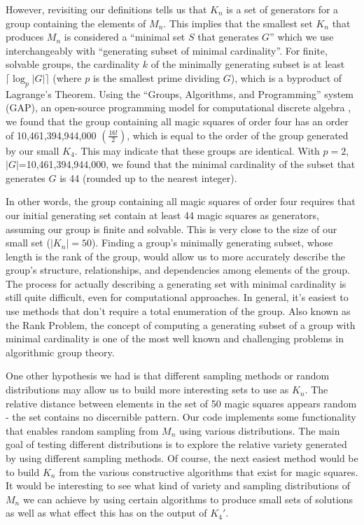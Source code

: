 \documentclass[12pt]{report}
\begin{document}
\par However, revisiting our definitions tells us that $K_n$ is a set of generators for a group
containing the elements of $M_n$. This implies that the smallest set $K_n$ that produces $M_n$ is
considered a ``minimal set $S$ that generates $G$'' which we  use interchangeably with ``generating
subset of minimal cardinality''. For finite, solvable groups, the cardinality $k$ of the minimally
generating subset is at least $\lceil\log_{p}{\left|G\right|}\rceil$ (where $p$ is the smallest
prime dividing $G$), which is a byproduct of Lagrange's Theorem. Using the ``Groups, Algorithms,
and Programming'' system (GAP), an open-source programming model for computational discrete algebra
, we found that the group containing all magic squares of order four has an order of
10,461,394,944,000 $\left(\frac{16!}{2}\right)$, which is equal to the order of the group generated 
by our small $K_4$. This may
indicate that these groups are identical. With $p=2$, $\left|G\right|$=10,461,394,944,000, we found
that the minimal cardinality of the subset that generates $G$ is 44 (rounded up to the nearest
integer).

\par In other words, the group containing all magic squares of order four requires that our initial
generating set contain at least 44 magic squares as generators, assuming our group is finite and
solvable. This is very close to the size of our small set ($\left|K_n\right|=50$). Finding a
group's minimally generating subset, whose length is the rank of the group, would allow us to more
accurately describe the group's structure, relationships, and dependencies among elements of the
group. The process for actually describing a generating set with minimal cardinality is still quite
difficult, even for computational approaches. In general, it's easiest to use methods that don't
require a total enumeration of the group. Also known as the Rank Problem, the concept of computing
a generating subset of a group with minimal cardinality is one of the most well known and
challenging problems in algorithmic group theory.

\par One other hypothesis we had is that different sampling methods or random distributions may
allow us to build more interesting sets to use as $K_n$. The relative distance between elements in
the set of 50 magic squares appears random \hyphen{} the set contains no discernible pattern. Our
code implements some functionality that enables random sampling from $M_n$ using various
distributions. The main goal of testing different distributions is to explore the relative variety
generated by using different sampling methods. Of course, the next easiest method would be to build
$K_n$ from the various constructive algorithms that exist for magic squares. It would be
interesting to see what kind of variety and sampling distributions of $M_n$ we can achieve by using
certain algorithms to produce small sets of solutions as well as what effect this has on the output
of $K_4\prime$.
\end{document}
